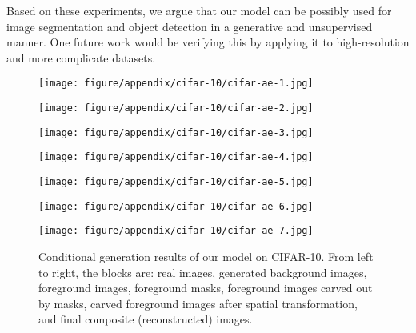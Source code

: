 \documentclass{article} \usepackage{iclr2017_conference,times}
\begin{document}
Based on these experiments, we argue that our model can be possibly used for image segmentation and object detection in a generative and unsupervised manner. One future work would be verifying this by applying it to high-resolution and more complicate datasets.
\label{subsec_CondGeneration}
\begin{figure}[!ht]
\begin{minipage}{0.138\linewidth}
\center
\texttt{[image: figure/appendix/cifar-10/cifar-ae-1.jpg]}
\end{minipage}
\begin{minipage}{0.138\linewidth}
\center
\texttt{[image: figure/appendix/cifar-10/cifar-ae-2.jpg]}
\end{minipage}
\begin{minipage}{0.138\linewidth}
\center
\texttt{[image: figure/appendix/cifar-10/cifar-ae-3.jpg]}
\end{minipage}
\begin{minipage}{0.138\linewidth}
\center
\texttt{[image: figure/appendix/cifar-10/cifar-ae-4.jpg]}
\end{minipage}
\begin{minipage}{0.138\linewidth}
\center
\texttt{[image: figure/appendix/cifar-10/cifar-ae-5.jpg]}
\end{minipage}
\begin{minipage}{0.138\linewidth}
\center
\texttt{[image: figure/appendix/cifar-10/cifar-ae-6.jpg]}
\end{minipage}
\begin{minipage}{0.138\linewidth}
\center
\texttt{[image: figure/appendix/cifar-10/cifar-ae-7.jpg]}
\end{minipage}
\caption{Conditional generation results of our model on CIFAR-10. From left to right, the blocks are: real images, generated background images, foreground images, foreground masks, foreground images carved out by masks, carved foreground images after spatial transformation, and final composite (reconstructed) images.}
\label{Fig_CIFAROutputs_Conditional}
\end{figure} 
\end{document}
